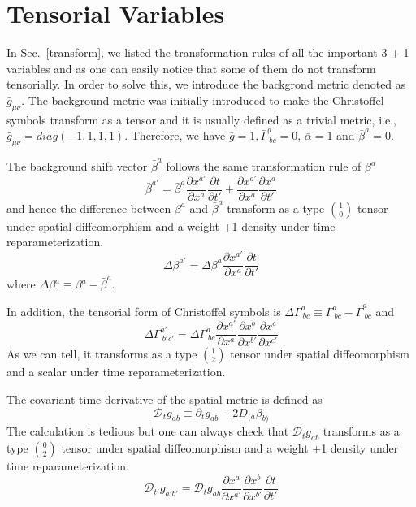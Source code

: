 \documentclass[letterpaper,nofootinbib,prd,amsmath,onecolumn]{revtex4-1}
\begin{document}
\section{Tensorial Variables}\label{tensorial}
In Sec.~\ref{transform}, we listed the transformation rules of all the important 3 + 1 variables and as one can easily notice that some of them do not transform tensorially. In order to solve this, we introduce the backgrond metric denoted as ${\bar g}_{\mu\nu}$. The background metric was initially introduced to make the Christoffel symbols transform as a tensor and it is usually defined as a trivial metric, i.e., ${\bar g}_{\mu\nu} = diag\left(-1,1,1,1\right)$. Therefore, we have ${\bar g} = 1, $${\bar \Gamma}^{a}_{~bc} = 0$, ${\bar \alpha} = 1$ and ${\bar \beta}^{a} = 0$. 

The background shift vector ${\bar \beta}^{a}$ follows the same transformation rule of $\beta^{a}$
\[
{\bar \beta}^{a'} = {\bar \beta}^{a}\frac{\partial x^{a'}}{\partial x^{a}}\frac{\partial t}{\partial t'} + \frac{\partial x^{a'}}{\partial x^{a}}\frac{\partial x^{a}}{\partial t'}
\]
and hence the difference between $\beta^{a}$ and ${\bar \beta}^{a}$ transform as a type $1 \choose 0$ tensor under spatial diffeomorphism and a weight +1 density under time reparameterization. 
\begin{equation}
\Delta \beta^{a'} = \Delta \beta^{a}\frac{\partial x^{a'}}{\partial x^{a}}\frac{\partial t}{\partial t'}
\end{equation}
where $\Delta \beta^{a} \equiv \beta^{a} - {\bar \beta}^{a}$.

In addition, the tensorial form of Christoffel symbols is $\Delta \Gamma^{a}_{~bc} \equiv \Gamma^{a}_{~bc} - {\bar \Gamma}^{a}_{~bc}$ and
\begin{equation}
\Delta \Gamma^{a'}_{~b'c'} = \Delta \Gamma^{a}_{~bc}\frac{\partial x^{a'}}{\partial x^{a}}\frac{\partial x^{b}}{\partial x^{b'}}\frac{\partial x^{c}}{\partial x^{c'}}
\end{equation}
As we can tell, it transforms as a type $1 \choose 2$ tensor under spatial diffeomorphism and a scalar under time reparameterization. 

The covariant time derivative of the spatial metric is defined as
\begin{equation}
\mathscr{D}_{t}g_{ab} \equiv \partial_{t}g_{ab} - 2D_{(a}\beta_{b)}
\end{equation}
The calculation is tedious but one can always check that $\mathscr{D}_{t}g_{ab}$ transforms as a type $0 \choose 2$ tensor under spatial diffeomorphism and a weight +1 density under time reparameterization. 
\begin{equation}
\mathscr{D}_{t'}g_{a'b'} = \mathscr{D}_{t}g_{ab}\frac{\partial x^{a}}{\partial x^{a'}}\frac{\partial x^{b}}{\partial x^{b'}}\frac{\partial t}{\partial t'}
\end{equation}
\end{document}
